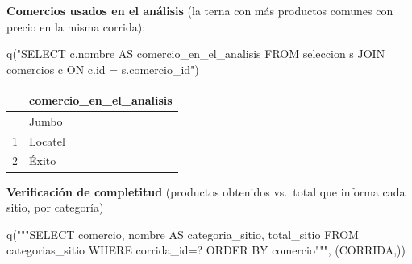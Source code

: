 \documentclass[
  spanish,
  letterpaper,
  DIV=11,
  numbers=noendperiod]{scrartcl}
\newenvironment{Shaded}{\begin{snugshade}}{\end{snugshade}}
\newcommand{\NormalTok}[1]{\textcolor[rgb]{0.00,0.23,0.31}{#1}}
\newcommand{\StringTok}[1]{\textcolor[rgb]{0.13,0.47,0.30}{#1}}
\newcounter{none} %
\begin{document}
\textbf{Comercios usados en el análisis} (la terna con más productos
comunes con precio en la misma corrida):

\begin{Shaded}
\begin{Highlighting}[]
\NormalTok{q(}\StringTok{"SELECT c.nombre AS comercio\_en\_el\_analisis FROM seleccion s JOIN comercios c ON c.id = s.comercio\_id"}\NormalTok{)}
\end{Highlighting}
\end{Shaded}

{\def\LTcaptype{none} %
\begin{longtable}[]{@{}ll@{}}
\toprule\noalign{}
& comercio\_en\_el\_analisis \\
\midrule\noalign{}
\endhead
\bottomrule\noalign{}
\endlastfoot
0 & Jumbo \\
1 & Locatel \\
2 & Éxito \\
\end{longtable}
}

\textbf{Verificación de completitud} (productos obtenidos vs.~total que
informa cada sitio, por categoría)

\begin{Shaded}
\begin{Highlighting}[]
\NormalTok{q(}\StringTok{"""SELECT comercio, nombre AS categoria\_sitio, total\_sitio FROM categorias\_sitio WHERE corrida\_id=? ORDER BY comercio"""}\NormalTok{, (CORRIDA,))}
\end{Highlighting}
\end{Shaded}
\end{document}
